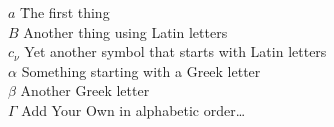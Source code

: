 
%
%
\begingroup
\newcommand{\Ab}[2]{\noindent  #1 \> #2 \\}
\newcommand{\Abi}[2]{\noindent #1 \hspace{1.5cm} \= #2 \\}
\begin{tabbing}
    \Abi{$a$}{The first thing}

    \Ab{$B$}{Another thing using Latin letters}
    \Ab{$c_{\nu}$}{Yet another symbol that starts with Latin letters}
    \Ab{$\alpha$}{Something starting with a Greek letter}
    \Ab{$\beta$}{Another Greek letter}
    \Ab{$\Gamma$}{Add Your Own in alphabetic order\ldots}
\end{tabbing}
\endgroup
\clearpage
